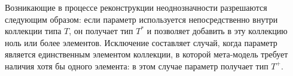 {Возникающие в процессе реконструкции неоднозначности разрешаются следующим образом: если параметр используется непосредственно внутри коллекции типа $T$, он получает тип $T^*$ и позволяет добавить в эту коллекцию ноль или более элементов. Исключение составляет случай, когда параметр является единственным элементом коллекции, в которой мета-модель требует наличия хотя бы одного элемента: в этом случае параметр получает тип $T^+$. 

}
